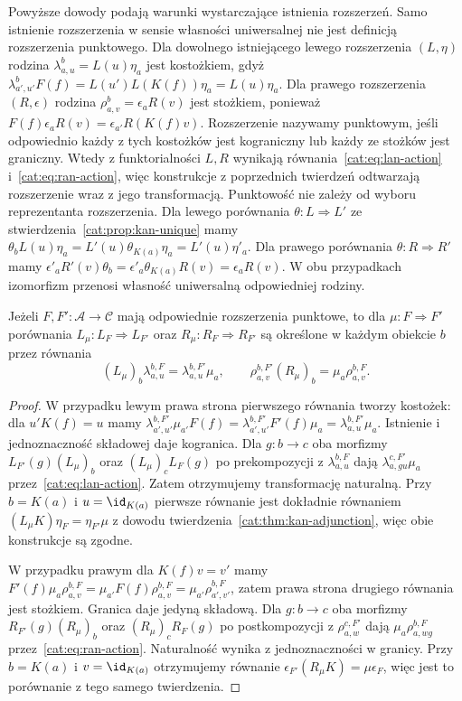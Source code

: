 \begin{uwaga}
Powyższe dowody podają warunki wystarczające istnienia rozszerzeń. Samo istnienie rozszerzenia w sensie własności uniwersalnej nie jest definicją rozszerzenia punktowego. Dla dowolnego istniejącego lewego rozszerzenia $(L,\eta)$ rodzina $\lambda^b_{a,u}=L(u)\eta_a$ jest kostożkiem, gdyż $\lambda^b_{a',u'}F(f)=L(u')L(K(f))\eta_a=L(u)\eta_a$. Dla prawego rozszerzenia $(R,\epsilon)$ rodzina $\rho^b_{a,v}=\epsilon_a R(v)$ jest stożkiem, ponieważ $F(f)\epsilon_a R(v)=\epsilon_{a'}R(K(f)v)$. Rozszerzenie nazywamy punktowym, jeśli odpowiednio każdy z tych kostożków jest kograniczny lub każdy ze stożków jest graniczny. Wtedy z funktorialności $L,R$ wynikają równania~\eqref{cat:eq:lan-action} i~\eqref{cat:eq:ran-action}, więc konstrukcje z poprzednich twierdzeń odtwarzają rozszerzenie wraz z jego transformacją. Punktowość nie zależy od wyboru reprezentanta rozszerzenia. Dla lewego porównania $\theta:L\Rightarrow L'$ ze stwierdzenia~\ref{cat:prop:kan-unique} mamy $\theta_b L(u)\eta_a=L'(u)\theta_{K(a)}\eta_a=L'(u)\eta'_a$. Dla prawego porównania $\theta:R\Rightarrow R'$ mamy $\epsilon'_a R'(v)\theta_b=\epsilon'_a\theta_{K(a)}R(v)=\epsilon_a R(v)$. W obu przypadkach izomorfizm przenosi własność uniwersalną odpowiedniej rodziny.
\end{uwaga}
\begin{stwierdzenie}\label{cat:prop:kan-pointwise-nat-action}
Jeżeli $F,F':\mathcal A\to\mathcal C$ mają odpowiednie rozszerzenia punktowe, to dla $\mu:F\Rightarrow F'$ porównania $L_\mu:L_F\Rightarrow L_{F'}$ oraz $R_\mu:R_F\Rightarrow R_{F'}$ są określone w każdym obiekcie $b$ przez równania
\[
 (L_\mu)_b\lambda^{b,F}_{a,u}=\lambda^{b,F'}_{a,u}\mu_a,
 \qquad
 \rho^{b,F'}_{a,v}(R_\mu)_b=\mu_a\rho^{b,F}_{a,v}.
\]
\end{stwierdzenie}
\begin{proof}
W przypadku lewym prawa strona pierwszego równania tworzy kostożek: dla $u'K(f)=u$ mamy $\lambda^{b,F'}_{a',u'}\mu_{a'}F(f)=\lambda^{b,F'}_{a',u'}F'(f)\mu_a=\lambda^{b,F'}_{a,u}\mu_a$. Istnienie i jednoznaczność składowej daje kogranica. Dla $g:b\to c$ oba morfizmy $L_{F'}(g)(L_\mu)_b$ oraz $(L_\mu)_c L_F(g)$ po prekompozycji z $\lambda^{b,F}_{a,u}$ dają $\lambda^{c,F'}_{a,gu}\mu_a$ przez~\eqref{cat:eq:lan-action}. Zatem otrzymujemy transformację naturalną. Przy $b=K(a)$ i $u=\id_{K(a)}$ pierwsze równanie jest dokładnie równaniem $(L_\mu K)\eta_F=\eta_{F'}\mu$ z dowodu twierdzenia~\ref{cat:thm:kan-adjunction}, więc obie konstrukcje są zgodne.

W przypadku prawym dla $K(f)v=v'$ mamy $F'(f)\mu_a\rho^{b,F}_{a,v}=\mu_{a'}F(f)\rho^{b,F}_{a,v}=\mu_{a'}\rho^{b,F}_{a',v'}$, zatem prawa strona drugiego równania jest stożkiem. Granica daje jedyną składową. Dla $g:b\to c$ oba morfizmy $R_{F'}(g)(R_\mu)_b$ oraz $(R_\mu)_c R_F(g)$ po postkompozycji z $\rho^{c,F'}_{a,w}$ dają $\mu_a\rho^{b,F}_{a,wg}$ przez~\eqref{cat:eq:ran-action}. Naturalność wynika z jednoznaczności w granicy. Przy $b=K(a)$ i $v=\id_{K(a)}$ otrzymujemy równanie $\epsilon_{F'}(R_\mu K)=\mu\epsilon_F$, więc jest to porównanie z tego samego twierdzenia.
\end{proof}
